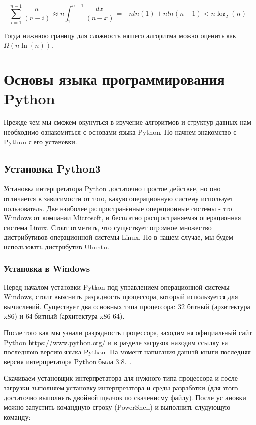 $$\sum_{i=1}^{n-1}\frac{n}{(n-i)} \approx n\int_1^{n-1}\frac{dx}{(n-x)} = -nln(1)+nln(n-1) < n\log_2(n)$$

Тогда нижнюю границу для сложность нашего алгоритма можно оценить как $\Omega(n\ln(n))$.

\chapter{Основы языка программирования Python}

Прежде чем мы сможем окунуться в изучение алгоритмов и структур данных
нам необходимо ознакомиться с основами языка Python. Но начнем знакомство 
с Python с его установки.

\section{Установка Python3}

Установка интерпретатора Python достаточно простое действие, но оно отличается
в зависимости от того, какую операционную систему использует пользователь. 
Две наиболее распространённые операционные системы - это Windows от 
компании Microsoft, и бесплатно распространяемая операционная система 
Linux. Стоит отметить, что существует огромное множество дистрибутивов 
операционной системы Linux. Но в нашем случае, мы будем использовать 
дистрибутив Ubuntu.

\subsection{Установка в Windows}

Перед началом установки Python под управлением операционной системы
Windows, стоит выяснить разрядность процессора, который используется
для вычислений. Существует два основных типа процессора: $32$ битный 
(архитектура x86) и $64$ битный (архитектура x86-64).

После того как мы узнали разрядность процессора, заходим на официальный 
сайт Python \url{https://www.python.org/} и в разделе загрузок 
находим ссылку на последнюю версию языка Python. На момент написания 
данной книги последняя версия интерпретатора Python была $3.8.1$.

Скачиваем установщик интерпретатора для нужного типа процессора и после 
загрузки выполняем установку интерпретатора и среды разработки (для этого 
достаточно выполнить двойной щелчок по скаченному файлу). После установки
можно запустить командную строку (PowerShell) и выполнить слудующую команду:

